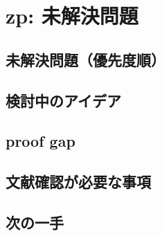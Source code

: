 
\section{zp: 未解決問題}

\subsection{未解決問題（優先度順）}

\subsection{検討中のアイデア}

\subsection{proof gap}

\subsection{文献確認が必要な事項}

\subsection{次の一手}
